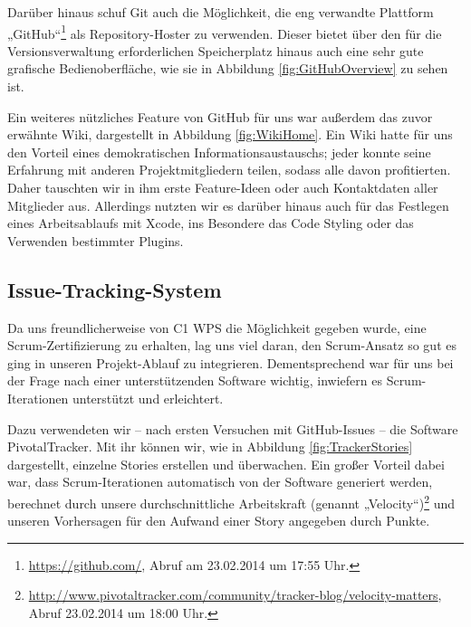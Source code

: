 	Darüber hinaus schuf Git auch die Möglichkeit, die eng verwandte Plattform „GitHub“\footnote{\url{https://github.com/}, Abruf am 23.02.2014 um 17:55 Uhr.} als Repository-Hoster zu verwenden. Dieser bietet über den für die Versionsverwaltung erforderlichen Speicherplatz hinaus auch eine sehr gute grafische Bedienoberfläche, wie sie in Abbildung \ref{fig:GitHubOverview} zu sehen ist.
	
	Ein weiteres nützliches Feature von GitHub für uns war außerdem das zuvor erwähnte Wiki, dargestellt in Abbildung \ref{fig:WikiHome}. Ein Wiki hatte für uns den Vorteil eines demokratischen Informationsaustauschs; jeder konnte seine Erfahrung mit anderen Projektmitgliedern teilen, sodass alle davon profitierten. Daher tauschten wir in ihm erste Feature-Ideen oder auch Kontaktdaten aller Mitglieder aus. Allerdings nutzten wir es darüber hinaus auch für das Festlegen eines Arbeitsablaufs mit Xcode, ins Besondere das Code Styling oder das Verwenden bestimmter Plugins.

\subsection{Issue-Tracking-System}
	Da uns freundlicherweise von C1 WPS die Möglichkeit gegeben wurde, eine Scrum-Zer\-ti\-fi\-zie\-rung zu erhalten, lag uns viel daran, den Scrum-Ansatz so gut es ging in unseren Projekt-Ablauf zu integrieren. Dementsprechend war für uns bei der Frage nach einer unterstützenden Software wichtig, inwiefern es Scrum-Iterationen unterstützt und erleichtert.
	
	Dazu verwendeten wir – nach ersten Versuchen mit GitHub-Issues – die Software PivotalTracker. Mit ihr können wir, wie in Abbildung \ref{fig:TrackerStories} dargestellt, einzelne Stories erstellen und überwachen. Ein großer Vorteil dabei war, dass Scrum-Iterationen automatisch von der Software generiert werden, berechnet durch unsere durchschnittliche Arbeitskraft (genannt „Velocity“)\footnote{\url{http://www.pivotaltracker.com/community/tracker-blog/velocity-matters}, Abruf 23.02.2014 um 18:00 Uhr.} und unseren Vorhersagen für den Aufwand einer Story angegeben durch Punkte.
	
